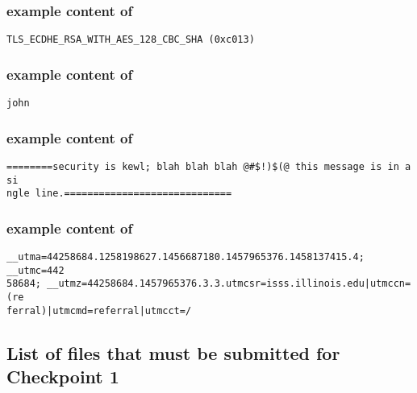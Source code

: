 \subsubsection*{example content of \texttt{\hyperlink{cp1servercs}{\fileservercs}}}
\begin{mdframed}
\begin{Verbatim}
TLS_ECDHE_RSA_WITH_AES_128_CBC_SHA (0xc013)
\end{Verbatim}
\end{mdframed}

\hypertarget{nameformat}{}
\subsubsection*{example content of \texttt{\hyperlink{cp1name}{\filename}}}
\begin{mdframed}
\begin{Verbatim}
john
\end{Verbatim}
\end{mdframed}

\hypertarget{msgformat}{}
\subsubsection*{example content of \texttt{\hyperlink{cp1msg}{\filemsg}}}
\begin{mdframed}
\begin{Verbatim}
========security is kewl; blah blah blah @#$!)$(@ this message is in a si
ngle line.=============================
\end{Verbatim}
\end{mdframed}

\hypertarget{cookieformat}{}
\subsubsection*{example content of \texttt{\hyperlink{cp1cookie}{\filecookie}}}
\begin{mdframed}
\begin{Verbatim}
__utma=44258684.1258198627.1456687180.1457965376.1458137415.4; __utmc=442
58684; __utmz=44258684.1457965376.3.3.utmcsr=isss.illinois.edu|utmccn=(re
ferral)|utmcmd=referral|utmcct=/
\end{Verbatim}
\end{mdframed}

\pagebreak

\subsection*{List of files that must be submitted for Checkpoint 1}

